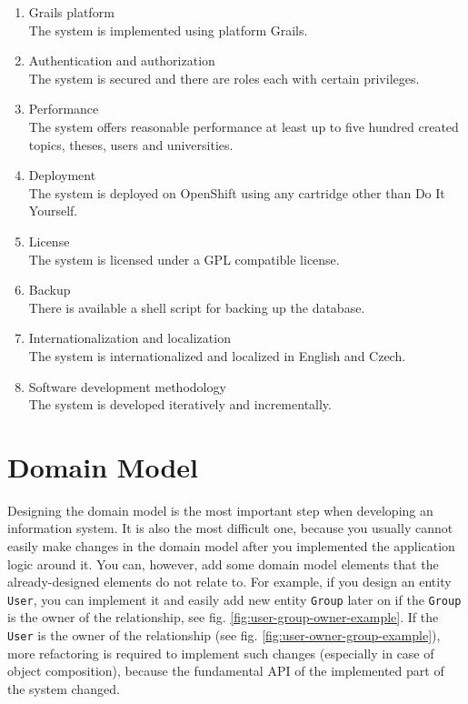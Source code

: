 \begin{enumerate}
    \item Grails platform\\
    The system is implemented using platform Grails.

    \item Authentication and authorization\\
    The system is secured and there are roles each with certain privileges.

    \item Performance\\
    The system offers reasonable performance at least up to five hundred created topics, theses, users and universities.

    \item Deployment\\
    The system is deployed on OpenShift using any cartridge other than Do It Yourself.

    \item License\\
    The system is licensed under a GPL compatible license.

    \item Backup\\
    There is available a shell script for backing up the database.

    \item Internationalization and localization\\
    The system is internationalized and localized in English and Czech.

    \item Software development methodology\\
    The system is developed iteratively and incrementally.

\end{enumerate}

\section{Domain Model}

Designing the domain model is the most important step when developing an information system. It is also the most difficult one, because you usually cannot easily make changes in the domain model after you implemented the application logic around it. You can, however, add some domain model elements that the already-designed elements do not relate to. For example, if you design an entity \texttt{User}, you can implement it and easily add new entity \texttt{Group} later on if the \texttt{Group} is the owner of the relationship, see fig. \ref{fig:user-group-owner-example}. If the \texttt{User} is the owner of the relationship (see fig. \ref{fig:user-owner-group-example}), more refactoring is required to implement such changes (especially in case of object composition), because the fundamental API of the implemented part of the system changed.

